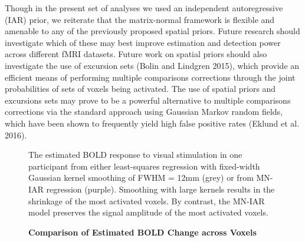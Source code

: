 \documentclass[9pt]{NEU560-final}
\begin{document}
Though in the present set of analyses we used an independent autoregressive (IAR) prior, we reiterate that the matrix-normal framework is flexible and amenable to any of the previously proposed spatial priors. Future research should investigate which of these may best improve estimation and detection power across different fMRI datasets. Future work on spatial priors should also investigate the use of excursion sets (Bolin and Lindgren 2015), which provide an efficient means of performing multiple comparisons corrections through the joint probabilities of sets of voxels being activated. The use of spatial priors and excursions sets may prove to be a powerful alternative to multiple comparisons corrections via the standard approach using Gaussian Markov random fields, which have been shown to frequently yield high false positive rates (Eklund et al. 2016).

\begin{figure}
\centerline{%
%
}
\caption{\textbf{Comparison of Estimated BOLD Change across Voxels}}
\par The estimated BOLD response to visual stimulation in one participant from either least-squares regression with fixed-width Gaussian kernel smoothing of FWHM = 12mm (grey) or from MN-IAR regression (purple). Smoothing with large kernels results in the shrinkage of the most activated voxels. By contrast, the MN-IAR model preserves the signal amplitude of the most activated voxels. 
\end{figure}

\nocite{*} 

\end{document}
